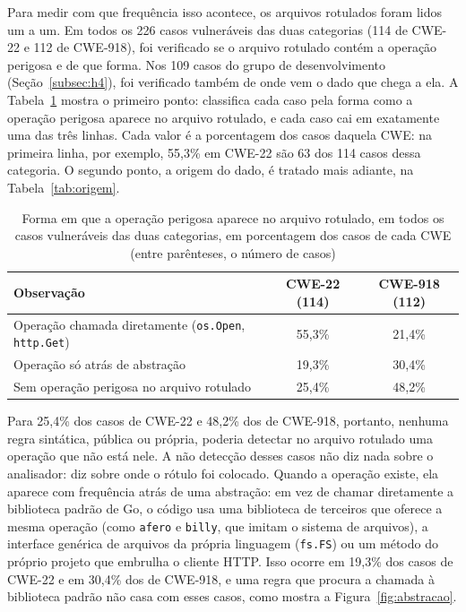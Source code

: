 Para medir com que frequência isso acontece, os arquivos rotulados foram lidos um a um. Em todos os 226 casos vulneráveis das duas categorias (114 de CWE-22 e 112 de CWE-918), foi verificado se o arquivo rotulado contém a operação perigosa e de que forma. Nos 109 casos do grupo de desenvolvimento (Seção~\ref{subsec:h4}), foi verificado também de onde vem o dado que chega a ela. A Tabela~\ref{tab:lacuna} mostra o primeiro ponto: classifica cada caso pela forma como a operação perigosa aparece no arquivo rotulado, e cada caso cai em exatamente uma das três linhas. Cada valor é a porcentagem dos casos daquela CWE: na primeira linha, por exemplo, 55,3\% em CWE-22 são 63 dos 114 casos dessa categoria. O segundo ponto, a origem do dado, é tratado mais adiante, na Tabela~\ref{tab:origem}.

\begin{table}[htpb]
    \centering
    \caption[Forma da operação perigosa no arquivo rotulado]{Forma em que a operação perigosa aparece no arquivo rotulado, em todos os casos vulneráveis das duas categorias, em porcentagem dos casos de cada CWE (entre parênteses, o número de casos)}
    \label{tab:lacuna}
    \renewcommand{\arraystretch}{1.4}
    \setlength{\tabcolsep}{4pt}
    \small
    \begin{tabular}{|l|c|c|}
        \hline
        \textbf{Observação} & \textbf{CWE-22 (114)} & \textbf{CWE-918 (112)} \\
        \hline
        Operação chamada diretamente (\texttt{os.Open}, \texttt{http.Get}) & 55,3\% & 21,4\% \\
        \hline
        Operação só atrás de abstração & 19,3\% & 30,4\% \\
        \hline
        Sem operação perigosa no arquivo rotulado & 25,4\% & 48,2\% \\
        \hline
    \end{tabular}
    \fontepesquisa
\end{table}

Para 25,4\% dos casos de CWE-22 e 48,2\% dos de CWE-918, portanto, nenhuma regra sintática, pública ou própria, poderia detectar no arquivo rotulado uma operação que não está nele. A não detecção desses casos não diz nada sobre o analisador: diz sobre onde o rótulo foi colocado. Quando a operação existe, ela aparece com frequência atrás de uma abstração: em vez de chamar diretamente a biblioteca padrão de Go, o código usa uma biblioteca de terceiros que oferece a mesma operação (como \texttt{afero} e \texttt{billy}, que imitam o sistema de arquivos), a interface genérica de arquivos da própria linguagem (\texttt{fs.FS}) ou um método do próprio projeto que embrulha o cliente HTTP. Isso ocorre em 19,3\% dos casos de CWE-22 e em 30,4\% dos de CWE-918, e uma regra que procura a chamada à biblioteca padrão não casa com esses casos, como mostra a Figura~\ref{fig:abstracao}.

